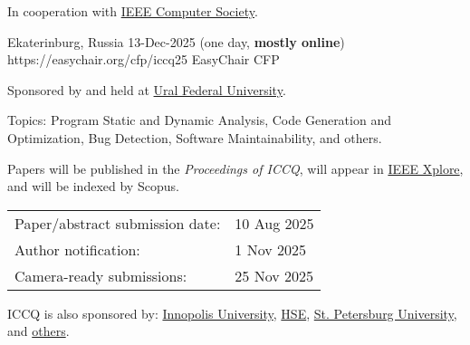 \documentclass{../cfp}
\begin{document}
\PrintLogo{}



In cooperation
with
\href{https://conferences.ieee.org/conferences_events/conferences/conferencedetails/53703}{IEEE Computer Society}.

\vspace{6pt}

\PrintAddress
  {Ekaterinburg, Russia}
  {13-Dec-2025 (one day, \textbf{mostly online})}
  {https://easychair.org/cfp/iccq25}
  {EasyChair CFP}

\vspace{12pt}
%
\vspace{12pt}

Sponsored by and held at \href{https://urfu.ru/}{Ural Federal University}.

Topics: Program Static and Dynamic Analysis,
Code Generation and Optimization,
Bug Detection, Software Maintainability, and others.

Papers will be published in the \textit{Proceedings of ICCQ},
will appear in \href{https://ieeexplore.ieee.org/Xplore/home.jsp}{IEEE Xplore\textsuperscript{\textregistered}},
and will be indexed by Scopus.

\begin{tabular}{@{}ll}
Paper/abstract submission date: & 10 Aug 2025 \\
Author notification: & 1 Nov 2025 \\
Camera-ready submissions: & 25 Nov 2025
\end{tabular}

\vspace{6pt}
ICCQ is also sponsored by:
\href{https://innopolis.university/}{Innopolis University},
\href{https://hse.ru/}{HSE},
\href{https://english.spbu.ru/}{St. Petersburg University},
and \href{https://www.iccq.ru/2025.html#partners}{others}.
\end{document}

